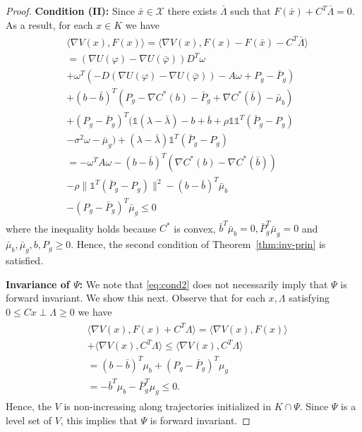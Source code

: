 \documentclass[journal]{IEEEtran}
\newcommand{\w}{\omega}
\newcommand{\1}{\mathds 1}
\newcommand{\vp}{\varphi}
\newcommand{\n}{\nabla}
\renewcommand{\l}{\lambda}
\theoremstyle{remark}
\theoremstyle{definition}
\begin{document}
\begin{proof}
  \textbf{Condition (II):} Since $\bar x\in\mathcal X$ there exists
  $\bar \Lambda$ such that $F(\bar x)+C^T\bar \Lambda=0.$ As a result,
  for each $x\in K$ we have
  \begin{align}\label{eq:cond2}
    \begin{aligned}
      & \langle \nabla V(x),F(x) \rangle=\langle\nabla V(x),
      F(x)-F(\bar x)-C^T\bar \Lambda \rangle
      \\
      &=(\n U(\vp)-\n U(\bar \vp))D^T\w
      \\
      &+\w^T(-D(\n U(\vp)-\n U(\bar \vp))-A\w+P_g-\bar P_g)
      \\
      &+(b-\bar b)^T(P_g-\n C^*(b)-\bar P_g+\n C^*(\bar b)-\bar \mu_b)
      \\
      &+(P_g-\bar P_g)^T(\1(\l-\bar\l)-b+\bar b+\rho \1\1^T (\bar
      P_g-P_g)
      \\
      &-\sigma^2\w-\bar\mu_g)+(\l-\bar \l)\1^T(\bar P_g-P_g)
      \\
      &=-\w^TA\w-(b-\bar b)^T(\n C^*(b)-\n C^*(\bar b))
      \\
      &-\rho\|\1^T(\bar P_g-P_g)\|^2-(b-\bar b)^T\bar \mu_b
      \\
      &-(P_g-\bar P_g)^T\bar \mu_g\leq0
    \end{aligned}
  \end{align}
  where the inequality holds because $C^*$ is convex, $\bar b^T\bar
  \mu_b=0, \bar P_g^T\bar \mu_g=0$ and $\bar \mu_b,\bar
  \mu_g,b,P_g\geq0$. Hence, the second condition of Theorem~\ref{thm:inv-prin} is satisfied.

  \textbf{Invariance of $\Psi$:} We note that \eqref{eq:cond2} does
  not necessarily imply that $\Psi$ is forward invariant. We show this
  next. Observe that for each $x,\Lambda$ satisfying $0\leq Cx\perp
  \Lambda\geq0$ we have
  \begin{align}\label{eq:inv-Psi}
    \begin{aligned}
      & \langle \n V(x),F(x)+C^T\Lambda\rangle=\langle \n
      V(x),F(x)\rangle
      \\
      &+\langle \n V(x), C^T\Lambda\rangle\leq \langle \n V(x),
      C^T\Lambda\rangle
      \\
      &=(b-\bar b)^T \mu_b+(P_g-\bar P_g)^T \mu_g
      \\
      &=-\bar b^T \mu_b-\bar P_g^T \mu_g\leq 0.
    \end{aligned}
  \end{align}
  Hence, the $V$ is non-increasing along trajectories initialized in
  $K\cap\Psi$. Since $\Psi$ is a level set of $V$, this implies that
  $\Psi$ is forward invariant.
  

\end{proof}
\end{document}
